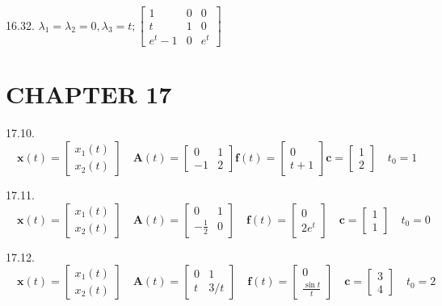 \documentclass[10pt]{article}
\begin{document}
16.32. $\lambda_{1}=\lambda_{2}=0, \lambda_{3}=t ;\left[\begin{array}{ccc}1 & 0 & 0 \\ t & 1 & 0 \\ e^{t}-1 & 0 & e^{t}\end{array}\right]$

\section*{CHAPTER 17}
17.10. $\quad \mathbf{x}(t)=\left[\begin{array}{l}x_{1}(t) \\ x_{2}(t)\end{array}\right] \quad \mathbf{A}(t)=\left[\begin{array}{rr}0 & 1 \\ -1 & 2\end{array}\right] \mathbf{f}(t)=\left[\begin{array}{c}0 \\ t+1\end{array}\right] \mathbf{c}=\left[\begin{array}{l}1 \\ 2\end{array}\right] \quad t_{0}=1$

17.11. $\quad \mathbf{x}(t)=\left[\begin{array}{l}x_{1}(t) \\ x_{2}(t)\end{array}\right] \quad \mathbf{A}(t)=\left[\begin{array}{cc}0 & 1 \\ -\frac{1}{2} & 0\end{array}\right] \quad \mathbf{f}(t)=\left[\begin{array}{c}0 \\ 2 e^{t}\end{array}\right] \quad \mathbf{c}=\left[\begin{array}{l}1 \\ 1\end{array}\right] \quad t_{0}=0$

17.12. $\quad \mathbf{x}(t)=\left[\begin{array}{l}x_{1}(t) \\ x_{2}(t)\end{array}\right] \quad \mathbf{A}(t)=\left[\begin{array}{cc}0 & 1 \\ t & 3 / t\end{array}\right] \quad \mathbf{f}(t)=\left[\begin{array}{c}0 \\ \frac{\sin t}{t}\end{array}\right] \quad \mathbf{c}=\left[\begin{array}{l}3 \\ 4\end{array}\right] \quad t_{0}=2$
\end{document}
